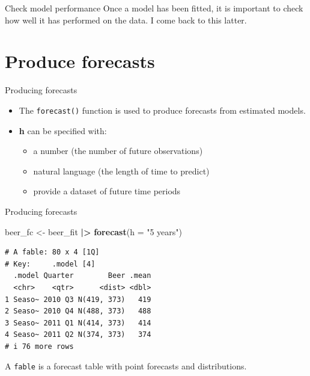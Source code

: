 \documentclass[
  14pt,
  ignorenonframetext,
  aspectratio=169,
]{beamer}
\newenvironment{Shaded}{\begin{snugshade}}{\end{snugshade}}
\newcommand{\AttributeTok}[1]{\textcolor[rgb]{0.13,0.29,0.53}{#1}}
\newcommand{\FunctionTok}[1]{\textcolor[rgb]{0.13,0.29,0.53}{\textbf{#1}}}
\newcommand{\NormalTok}[1]{#1}
\newcommand{\OtherTok}[1]{\textcolor[rgb]{0.56,0.35,0.01}{#1}}
\newcommand{\SpecialCharTok}[1]{\textcolor[rgb]{0.81,0.36,0.00}{\textbf{#1}}}
\newcommand{\StringTok}[1]{\textcolor[rgb]{0.31,0.60,0.02}{#1}}
\providecommand{\tightlist}{%
  \setlength{\itemsep}{0pt}\setlength{\parskip}{0pt}}
\renewenvironment{Shaded}{\vspace*{0.15cm}\color{black}\fontsize{10}{10}\sf\begin{snugshade}\color{black}}{\end{snugshade}}
\begin{document}
\begin{frame}{Check model performance}
\protect{}\label{check-model-performance}
Once a model has been fitted, it is important to check how well it has
performed on the data. I come back to this latter.
\end{frame}

\section{Produce forecasts}\label{produce-forecasts}

\begin{frame}[fragile]{Producing forecasts}
\protect{}\label{producing-forecasts}
\begin{itemize}
\tightlist
\item
  The \texttt{forecast()} function is used to produce forecasts from
  estimated models.
\item
  \textbf{h} can be specified with:

  \begin{itemize}
  \tightlist
  \item
    a number (the number of future observations)
  \item
    natural language (the length of time to predict)
  \item
    provide a dataset of future time periods
  \end{itemize}
\end{itemize}
\end{frame}

\begin{frame}[fragile]{Producing forecasts}
\protect{}\label{producing-forecasts-1}
\fontsize{10}{13}\sf

\begin{Shaded}
\begin{Highlighting}[]
\NormalTok{beer\_fc }\OtherTok{\textless{}{-}}\NormalTok{ beer\_fit }\SpecialCharTok{|\textgreater{}}
  \FunctionTok{forecast}\NormalTok{(}\AttributeTok{h =} \StringTok{"5 years"}\NormalTok{)}
\end{Highlighting}
\end{Shaded}

\begin{verbatim}
# A fable: 80 x 4 [1Q]
# Key:     .model [4]
  .model Quarter        Beer .mean
  <chr>    <qtr>      <dist> <dbl>
1 Seaso~ 2010 Q3 N(419, 373)   419
2 Seaso~ 2010 Q4 N(488, 373)   488
3 Seaso~ 2011 Q1 N(414, 373)   414
4 Seaso~ 2011 Q2 N(374, 373)   374
# i 76 more rows
\end{verbatim}

\vspace*{0.2cm}\begin{alertblock}{}
A \texttt{fable} is a forecast table with point forecasts and distributions.
\end{alertblock}
\end{frame}
\end{document}
